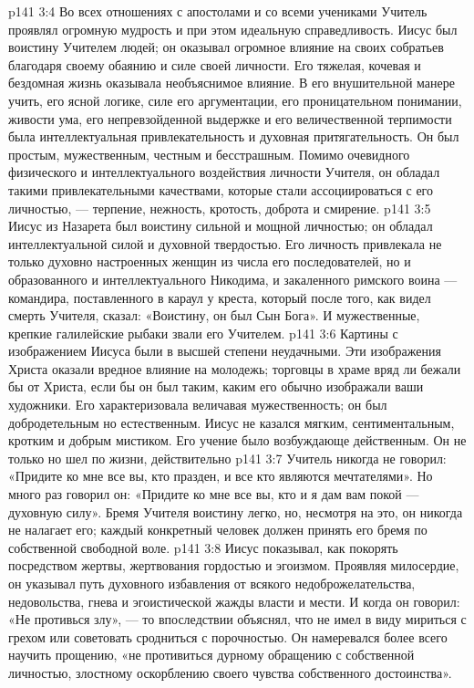 \vs p141 3:4 \pc Во всех отношениях с апостолами и со всеми учениками Учитель проявлял огромную мудрость и при этом идеальную справедливость. Иисус был воистину Учителем людей; он оказывал огромное влияние на своих собратьев благодаря своему обаянию и силе своей личности. Его тяжелая, кочевая и бездомная жизнь оказывала необъяснимое влияние. В его внушительной манере учить, его ясной логике, силе его аргументации, его проницательном понимании, живости ума, его непревзойденной выдержке и его величественной терпимости была интеллектуальная привлекательность и духовная притягательность. Он был простым, мужественным, честным и бесстрашным. Помимо очевидного физического и интеллектуального воздействия личности Учителя, он обладал такими привлекательными качествами, которые стали ассоциироваться с его личностью, --- терпение, нежность, кротость, доброта и смирение.
\vs p141 3:5 Иисус из Назарета был воистину сильной и мощной личностью; он обладал интеллектуальной силой и духовной твердостью. Его личность привлекала не только духовно настроенных женщин из числа его последователей, но и образованного и интеллектуального Никодима, и закаленного римского воина --- командира, поставленного в караул у креста, который после того, как видел смерть Учителя, сказал: «Воистину, он был Сын Бога». И мужественные, крепкие галилейские рыбаки звали его Учителем.
\vs p141 3:6 Картины с изображением Иисуса были в высшей степени неудачными. Эти изображения Христа оказали вредное влияние на молодежь; торговцы в храме вряд ли бежали бы от Христа, если бы он был таким, каким его обычно изображали ваши художники. Его характеризовала величавая мужественность; он был добродетельным но естественным. Иисус не казался мягким, сентиментальным, кротким и добрым мистиком. Его учение было возбуждающе действенным. Он не только  но шел по жизни, действительно 
\vs p141 3:7 Учитель никогда не говорил: «Придите ко мне все вы, кто празден, и все кто являются мечтателями». Но много раз говорил он: «Придите ко мне все вы, кто  и я дам вам покой --- духовную силу». Бремя Учителя воистину легко, но, несмотря на это, он никогда не налагает его; каждый конкретный человек должен принять его бремя по собственной свободной воле.
\vs p141 3:8 Иисус показывал, как покорять посредством жертвы, жертвования гордостью и эгоизмом. Проявляя милосердие, он указывал путь духовного избавления от всякого недоброжелательства, недовольства, гнева и эгоистической жажды власти и мести. И когда он говорил: «Не противься злу», --- то впоследствии объяснял, что не имел в виду мириться с грехом или советовать сродниться с порочностью. Он намеревался более всего научить прощению, «не противиться дурному обращению с собственной личностью, злостному оскорблению своего чувства собственного достоинства».
